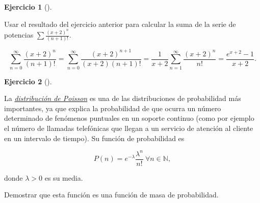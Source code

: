 \documentclass[
  a4paper,
]{scrreport}
\theoremstyle{definition}
\newtheorem{exercise}{Ejercicio}[chapter]
\theoremstyle{remark}
\begin{document}
\leavevmode{}%
\begin{exercise}[]\label{exr-suma-serie-potencias}

Usar el resultado del ejercicio anterior para calcular la suma de la
serie de potencias \(\sum \frac{(x+2)^n}{(n+1)!}\).

\end{exercise}

\begin{tcolorbox}[enhanced jigsaw, left=2mm, arc=.35mm, coltitle=black, toprule=.15mm, colback=white, breakable, bottomrule=.15mm, colbacktitle=quarto-callout-tip-color!10!white, bottomtitle=1mm, toptitle=1mm, opacityback=0, titlerule=0mm, opacitybacktitle=0.6, title=\textcolor{quarto-callout-tip-color}{\faLightbulb}\hspace{0.5em}{Solución}, rightrule=.15mm, leftrule=.75mm, colframe=quarto-callout-tip-color-frame]

\[
\sum_{n=0}^\infty \frac{(x+2)^n}{(n+1)!} = \sum_{n=0}^\infty \frac{(x+2)^{n+1}}{(x+2)(n+1)!} = \frac{1}{x+2}\sum_{n=1}^\infty \frac{(x+2)^n}{n!} = \frac{e^{x+2}-1}{x+2}.
\]

\end{tcolorbox}

\leavevmode{}%
\begin{exercise}[]\label{exr-serie-poisson}

La
\href{https://es.wikipedia.org/wiki/Distribuci\%C3\%B3n_de_Poisson}{\emph{distribución
de Poisson}} es una de las distribuciones de probabilidad más
importantes, ya que explica la probabilidad de que ocurra un número
determinado de fenómenos puntuales en un soporte continuo (como por
ejemplo el número de llamadas telefónicas que llegan a un servicio de
atención al cliente en un intervalo de tiempo). Su función de
probabilidad es

\[
P(n)= e^{-\lambda}\frac{\lambda^n}{n!}\ \forall n\in \mathbb{N},
\]

donde \(\lambda>0\) es su media.

Demostrar que esta función es una función de masa de probabilidad.

\end{exercise}
\end{document}
